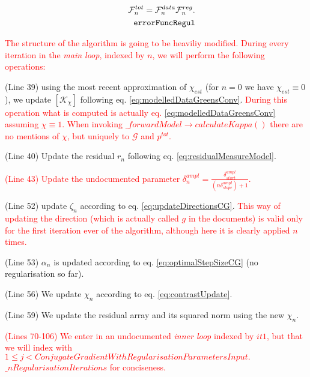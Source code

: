 \documentclass[10pt,a4paper]{article}
\begin{document}
\begin{align} \label{eq:errorFuncRegul} \mathcal{F}^{tot}_n =
\mathcal{F}^{data}_n \mathcal{F}^{reg}_n.\\
\tag*{\texttt{errorFuncRegul}}
\end{align}

\textcolor{red}{The structure of the algorithm is going to be heaviliy modified.
During every iteration in the \textit{main loop}, indexed by $n$, we will perform the following operations:}
\begin{enumerate}
\item (Line 39) using the most recent approximation of $\chi_{est} $ (for $n=0$ we have $\chi_{est} \equiv 0$), we update $[\mathcal{K}_\chi]$ following eq. \eqref{eq:modelledDataGreensConv}. 
\textcolor{red}{During this operation what is computed is actually eq. \eqref{eq:modelledDataGreensConv} assuming $\chi \equiv 1$. When invoking $\_forwardModel\rightarrow calculateKappa()$ there are no mentions of $\chi$, but uniquely to $\mathcal{G}$ and $p^{tot}$.
}
\item (Line 40) Update the residual $r_n$ following eq. \eqref{eq:residualMeasureModel}.
\textcolor{red}{\item (Line 43) Update the undocumented parameter $\delta^{ampl}_n = \frac{\delta^{ampl}_{start}}{(n  \delta^{ampl}_{slope}) +1}$.}
\item (Line 52) update $\zeta_n$ according to eq. \eqref{eq:updateDirectionsCG}. 
\textcolor{red}{This way of updating the direction (which is actually called $g$ in the documents) is valid only for the first iteration ever of the algorithm, although here it is clearly applied $n$ times.}
\item (Line 53)  $\alpha_n$ is updated according to eq. \eqref{eq:optimalStepSizeCG} (no regularisation so far).
\item (Line 56) We update $\chi_n$ according to eq. \eqref{eq:contrastUpdate}.
\item (Line 59) We update the residual array and its squared norm using the new $\chi_n$.
\textcolor{red}{\item (Lines 70-106) We enter in an undocumented \textit{inner loop} indexed by $it1$, but that we will index with $1\leq j <  ConjugateGradientWithRegularisationParametersInput.$ $ \_nRegularisationIterations$ for conciseness.}
\end{enumerate}
\end{document}
